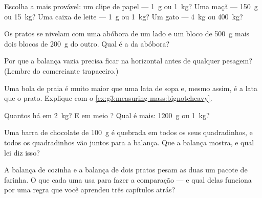 \begin{exercise}[$\star$]\label{exo:g3:measuring-mass:2}
Escolha a  mais provável: um clipe de papel --- \qty{1}{g} ou
\qty{1}{kg}? Uma maçã --- \qty{150}{g} ou \qty{15}{kg}? Uma caixa de
leite --- \qty{1}{g} ou \qty{1}{kg}? Um gato --- \qty{4}{kg} ou
\qty{400}{kg}?
\end{exercise}

\begin{exercise}[$\star$]\label{exo:g3:measuring-mass:3}
Os pratos se nivelam com uma abóbora de um lado e um bloco de
\qty{500}{g} mais dois blocos de \qty{200}{g} do outro. Qual é a
 da abóbora?
\end{exercise}

\begin{exercise}[$\star$]\label{exo:g3:measuring-mass:4}
Por que a balança vazia precisa ficar na horizontal antes de qualquer
pesagem? (Lembre do comerciante trapaceiro.)
\end{exercise}

\begin{exercise}[$\star$]\label{exo:g3:measuring-mass:5}
Uma bola de praia é muito maior que uma lata de sopa e, mesmo assim,
é a lata que  o prato. Explique com o
\cref{ex:g3:measuring-mass:bignotcheavy}.
\end{exercise}

\begin{exercise}[$\star$]\label{exo:g3:measuring-mass:6}
Quantos  há em \qty{2}{kg}? E em meio ? Qual é mais:
\qty{1200}{g} ou \qty{1}{kg}?
\end{exercise}

\begin{exercise}[$\star$]\label{exo:g3:measuring-mass:7}
Uma barra de chocolate de \qty{100}{g} é quebrada em todos os seus
quadradinhos, e todos os quadradinhos vão juntos para a balança. Que
 a balança mostra, e qual lei diz isso?
\end{exercise}

\begin{exercise}[$\star$]\label{exo:g3:measuring-mass:8}
A balança de cozinha e a balança de dois pratos pesam as duas um
pacote de farinha. O que cada uma usa para fazer a comparação --- e
qual delas funciona por uma regra que você aprendeu três capítulos
atrás?
\end{exercise}


